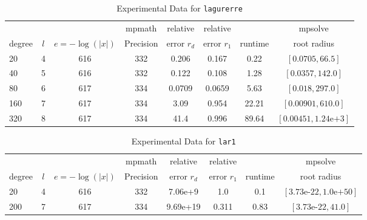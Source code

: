 \documentclass[sigconf]{acmart}
\begin{document}
\begin{table}[t]
\caption{Experimental Data for \texttt{lagurerre}} %
\label{tab:lagurerre}
\vskip -0.15in
\begin{center}
\begin{small}
\begin{sc}
\begin{tabular}{lccccccc}
\toprule
&  &  & mpmath & relative  & relative &  & mpsolve \\
degree  & $l$& $e=-\log(|x|)$& Precision &error $r_d$       & error $r_1$ &runtime& root radius\\
\midrule
 20 & 4 & 616 & 332 & 0.206 & 0.167 & 0.22 & $[0.0705, 66.5]$\\
 40 & 5 & 616 & 332 & 0.122 & 0.108 & 1.28 & $[0.0357, 142.0]$\\
 80 & 6 & 617 & 334 & 0.0709 & 0.0659 & 5.63 & $[0.018, 297.0]$\\
 160 & 7 & 617 & 334 & 3.09 & 0.954 & 22.21 & $[0.00901, 610.0]$\\
 320 & 8 & 617 & 334 & 41.4 & 0.996 & 89.64 & $[0.00451, 1.24\text{e+}3]$\\
\bottomrule
\end{tabular}
\end{sc}
\end{small}
\end{center}
\vskip 0.05in
\end{table}

\begin{table}[t]
\caption{Experimental Data for \texttt{lar1}} %
\label{tab:lar1}
\vskip -0.15in
\begin{center}
\begin{small}
\begin{sc}
\begin{tabular}{lccccccc}
\toprule
&  &  & mpmath & relative  & relative &  & mpsolve \\
degree  & $l$& $e=-\log(|x|)$& Precision &error $r_d$       & error $r_1$ &runtime& root radius\\
\midrule
 20 & 4 & 616 & 332 & 7.06e+9 & 1.0 & 0.1 & $[3.73\text{e-}22, 1.0\text{e+}50]$\\
 200 & 7 & 617 & 334 & 9.69e+19 & 0.311 & 0.83 & $[3.73\text{e-}22, 41.0]$\\
\bottomrule
\end{tabular}
\end{sc}
\end{small}
\end{center}
\vskip 0.05in
\end{table}
\end{document}
